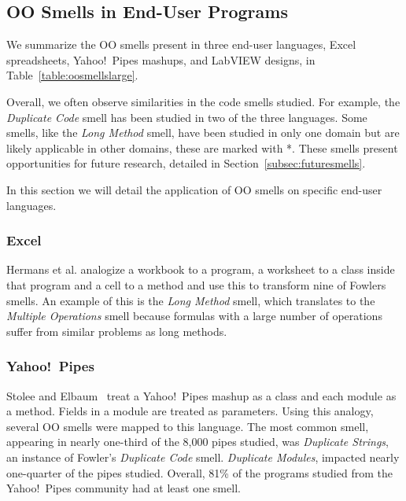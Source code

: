 \documentclass[10pt,conference,compsocconf]{IEEEtran}
\begin{document}
\subsection{OO Smells in End-User Programs}
\label{sec:smells:oo}
 We summarize the OO smells present in  three end-user languages, Excel spreadsheets, Yahoo!\ Pipes mashups, and LabVIEW designs, in Table~\ref{table:oosmellslarge}.
 
 Overall, we often observe similarities in the code smells studied. For example, the \emph{Duplicate Code} smell has been studied in two of the three languages.
 Some smells, like the \emph{Long Method} smell, have been studied in only one domain but are likely applicable in other domains, these are marked with *.
 These smells present opportunities for future research, detailed in  Section~\ref{subsec:futuresmells}.
 
 In this section we will detail the application of OO smells on specific end-user languages.
 

 \subsubsection{Excel}
Hermans et al. \cite{Hermans2012inter,Hermans2012intra} analogize a workbook to a program, a worksheet to a class inside that program and a cell to a method and use this to transform nine of Fowlers smells.
An example of this is the \emph{Long Method} smell, which translates to the \emph{Multiple Operations} smell because formulas with a large number of operations suffer from similar problems as long methods.

\subsubsection{Yahoo!\ Pipes}
Stolee and Elbaum~\cite{Stolee2011, StoleeTSE2013} treat a Yahoo!\ Pipes mashup as a class and each module as a method.  Fields in a module are treated as parameters. Using this analogy,  several OO smells were mapped to this language. The most common smell, appearing in nearly one-third of the 8,000 pipes studied, was \emph{Duplicate Strings}, an instance of Fowler's \emph{Duplicate Code} smell. 
\emph{Duplicate Modules}, impacted nearly one-quarter of the pipes studied. 
 Overall, 81\% of the programs studied from the Yahoo!\ Pipes community had at least one smell. 
 
\end{document}
